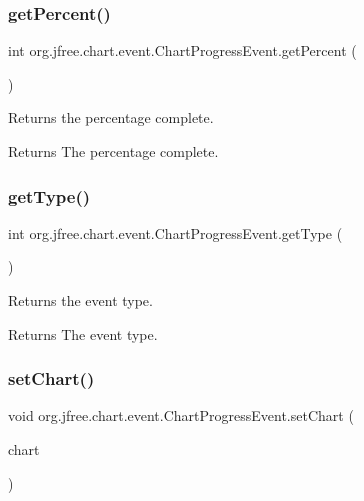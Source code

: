 \subsubsection{\texorpdfstring{get\+Percent()}{getPercent()}}
{\footnotesize\ttfamily int org.\+jfree.\+chart.\+event.\+Chart\+Progress\+Event.\+get\+Percent (\begin{DoxyParamCaption}{ }\end{DoxyParamCaption})}

Returns the percentage complete.

\begin{DoxyReturn}{Returns}
The percentage complete. 
\end{DoxyReturn}
\mbox{\label{classorg_1_1jfree_1_1chart_1_1event_1_1_chart_progress_event_adcd2bd63c33c046c295ffc2231c9a884}} 
\subsubsection{\texorpdfstring{get\+Type()}{getType()}}
{\footnotesize\ttfamily int org.\+jfree.\+chart.\+event.\+Chart\+Progress\+Event.\+get\+Type (\begin{DoxyParamCaption}{ }\end{DoxyParamCaption})}

Returns the event type.

\begin{DoxyReturn}{Returns}
The event type. 
\end{DoxyReturn}
\mbox{\label{classorg_1_1jfree_1_1chart_1_1event_1_1_chart_progress_event_a809253c14d62e53ddf787fec8282db08}} 
\subsubsection{\texorpdfstring{set\+Chart()}{setChart()}}
{\footnotesize\ttfamily void org.\+jfree.\+chart.\+event.\+Chart\+Progress\+Event.\+set\+Chart (\begin{DoxyParamCaption}\item[{\mbox{\hyperlink{classorg_1_1jfree_1_1chart_1_1_j_free_chart}{J\+Free\+Chart}}}]{chart }\end{DoxyParamCaption})}

